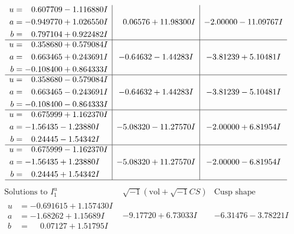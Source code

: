 \documentclass[1p]{elsarticle_modified}
\theoremstyle{definition}
\newcommand{\I}{\sqrt{-1}}
\begin{document}
$$\begin{array}{c|c|c}
\begin{aligned}
u &= \phantom{-}0.607709 - 1.116880 I \\
a &= -0.949770 + 1.026550 I \\
b &= \phantom{-}0.797104 + 0.922482 I\end{aligned}
 & \phantom{-}0.06576 + 11.98300 I & -2.00000 - 11.09767 I \\ \hline\begin{aligned}
u &= \phantom{-}0.358680 + 0.579084 I \\
a &= \phantom{-}0.663465 + 0.243691 I \\
b &= -0.108400 + 0.864333 I\end{aligned}
 & -0.64632 - 1.44283 I & -3.81239 + 5.10481 I \\ \hline\begin{aligned}
u &= \phantom{-}0.358680 - 0.579084 I \\
a &= \phantom{-}0.663465 - 0.243691 I \\
b &= -0.108400 - 0.864333 I\end{aligned}
 & -0.64632 + 1.44283 I & -3.81239 - 5.10481 I \\ \hline\begin{aligned}
u &= \phantom{-}0.675999 + 1.162370 I \\
a &= -1.56435 - 1.23880 I \\
b &= \phantom{-}0.24445 - 1.54342 I\end{aligned}
 & -5.08320 - 11.27570 I & -2.00000 + 6.81954 I \\ \hline\begin{aligned}
u &= \phantom{-}0.675999 - 1.162370 I \\
a &= -1.56435 + 1.23880 I \\
b &= \phantom{-}0.24445 + 1.54342 I\end{aligned}
 & -5.08320 + 11.27570 I & -2.00000 - 6.81954 I\\
 \hline 
 \end{array}$$\newpage$$\begin{array}{c|c|c}  
\text{Solutions to }I^u_{1}& \I (\text{vol} + \sqrt{-1}CS) & \text{Cusp shape}\\
 \hline 
\begin{aligned}
u &= -0.691615 + 1.157430 I \\
a &= -1.68262 + 1.15689 I \\
b &= \phantom{-}0.07127 + 1.51795 I\end{aligned}
 & -9.17720 + 6.73033 I & -6.31476 - 3.78221 I \\ \hline\begin{aligned}

\end{aligned}
\end{array}$$
\end{document}
